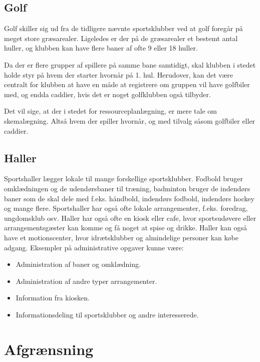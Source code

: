 \subsection{Golf}

Golf skiller sig ud fra de tidligere nævnte sportsklubber ved at golf foregår på meget store græsarealer. Ligeledes er der på de græsarealer et bestemt antal huller, og klubben kan have flere baner af ofte 9 eller 18 huller. 

Da der er flere grupper af spillere på samme bane samtidigt, skal klubben i stedet holde styr på hvem der starter hvornår på 1. hul. Herudover, kan det være centralt for klubben at have en måde at registrere om gruppen vil have golfbiler med, og endda caddier, hvis det er noget golfklubben også tilbyder.

Det vil sige, at der i stedet for ressourceplanlægning, er mere tale om skemalægning. Altså hvem der spiller hvornår, og med tilvalg såsom golfbiler eller caddier.


\subsection{Haller}

Sportshaller lægger lokale til mange forskellige sportsklubber. Fodbold bruger omklædningen og de udendørsbaner til træning, badminton bruger de indendørs baner som de skal dele med f.eks. håndbold, indendørs fodbold, indendørs hockey og mange flere. Sportshaller har også ofte lokale arrangementer, f.eks. foredrag, ungdomsklub osv. 
Haller har også ofte en kiosk eller cafe, hvor sportsudøvere eller arrangementsgæster kan komme og få noget at spise og drikke. 
Haller kan også have et motionscenter, hvor idrætsklubber og almindelige personer kan købe adgang. 
Eksempler på administrative opgaver kunne være:

\begin{itemize}
\item Administration af baner og omklædning.
\item Administration af andre typer arrangementer.
\item Information fra kiosken.
\item Informationsdeling til sportsklubber og andre interesserede.
\end{itemize}

\section{Afgrænsning}


